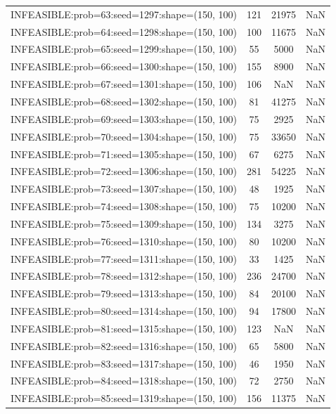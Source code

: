 \begin{longtable}{lccc}
INFEASIBLE:prob=63:seed=1297:shape=(150, 100)  &   121 & 21975 &    NaN \\
INFEASIBLE:prob=64:seed=1298:shape=(150, 100)  &   100 & 11675 &    NaN \\
INFEASIBLE:prob=65:seed=1299:shape=(150, 100)  &    55 &  5000 &    NaN \\
INFEASIBLE:prob=66:seed=1300:shape=(150, 100)  &   155 &  8900 &    NaN \\
INFEASIBLE:prob=67:seed=1301:shape=(150, 100)  &   106 &   NaN &    NaN \\
INFEASIBLE:prob=68:seed=1302:shape=(150, 100)  &    81 & 41275 &    NaN \\
INFEASIBLE:prob=69:seed=1303:shape=(150, 100)  &    75 &  2925 &    NaN \\
INFEASIBLE:prob=70:seed=1304:shape=(150, 100)  &    75 & 33650 &    NaN \\
INFEASIBLE:prob=71:seed=1305:shape=(150, 100)  &    67 &  6275 &    NaN \\
INFEASIBLE:prob=72:seed=1306:shape=(150, 100)  &   281 & 54225 &    NaN \\
INFEASIBLE:prob=73:seed=1307:shape=(150, 100)  &    48 &  1925 &    NaN \\
INFEASIBLE:prob=74:seed=1308:shape=(150, 100)  &    75 & 10200 &    NaN \\
INFEASIBLE:prob=75:seed=1309:shape=(150, 100)  &   134 &  3275 &    NaN \\
INFEASIBLE:prob=76:seed=1310:shape=(150, 100)  &    80 & 10200 &    NaN \\
INFEASIBLE:prob=77:seed=1311:shape=(150, 100)  &    33 &  1425 &    NaN \\
INFEASIBLE:prob=78:seed=1312:shape=(150, 100)  &   236 & 24700 &    NaN \\
INFEASIBLE:prob=79:seed=1313:shape=(150, 100)  &    84 & 20100 &    NaN \\
INFEASIBLE:prob=80:seed=1314:shape=(150, 100)  &    94 & 17800 &    NaN \\
INFEASIBLE:prob=81:seed=1315:shape=(150, 100)  &   123 &   NaN &    NaN \\
INFEASIBLE:prob=82:seed=1316:shape=(150, 100)  &    65 &  5800 &    NaN \\
INFEASIBLE:prob=83:seed=1317:shape=(150, 100)  &    46 &  1950 &    NaN \\
INFEASIBLE:prob=84:seed=1318:shape=(150, 100)  &    72 &  2750 &    NaN \\
INFEASIBLE:prob=85:seed=1319:shape=(150, 100)  &   156 & 11375 &    NaN \\

\end{longtable}

